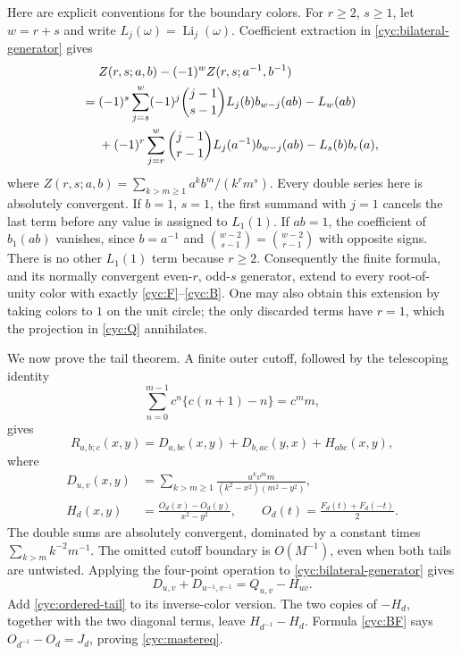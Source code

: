 \documentclass[11pt,a4paper]{article}
\numberwithin{equation}{section}
\theoremstyle{definition}
\theoremstyle{remark}
\begin{document}
Here are explicit conventions for the boundary colors.  For $r\ge2$,
$s\ge1$, let $w=r+s$ and write $L_j(\omega)=\operatorname{Li}_j(\omega)$.
Coefficient extraction in \eqref{cyc:bilateral-generator} gives
\begin{align}\label{cyc:finite-parity}
 &Z(r,s;a,b)-(-1)^w Z(r,s;a^{-1},b^{-1})\notag\\
 ={}&(-1)^s\sum_{j=s}^{w}(-1)^j
          \binom{j-1}{s-1}L_j(b)b_{w-j}(ab)-L_w(ab)\notag\\
 &+(-1)^r\sum_{j=r}^{w}\binom{j-1}{r-1}
               L_j(a^{-1})b_{w-j}(ab)-L_s(b)b_r(a),
\end{align}
where
$Z(r,s;a,b)=\sum_{k>m\ge1}a^k b^m/(k^r m^s)$.
Every double series here is absolutely convergent.  If $b=1$, $s=1$,
the first summand with $j=1$ cancels the last term before any value
is assigned to $L_1(1)$.  If $ab=1$, the coefficient of $b_1(ab)$
vanishes, since $b=a^{-1}$ and
$\binom{w-2}{s-1}=\binom{w-2}{r-1}$ with opposite signs.
There is no other $L_1(1)$ term because $r\ge2$.  Consequently the
finite formula, and its normally convergent even-$r$, odd-$s$
generator, extend to every root-of-unity color with exactly
\eqref{cyc:F}--\eqref{cyc:B}.  One may also obtain this extension
by taking colors to $1$ on the unit circle; the only discarded
terms have $r=1$, which the projection in \eqref{cyc:Q} annihilates.

We now prove the tail theorem.  A finite outer cutoff, followed by
the telescoping identity
\[
 \sum_{n=0}^{m-1}c^n\{c(n+1)-n\}=c^m m,
\]
gives
\begin{equation}\label{cyc:ordered-tail}
 R_{a,b;c}(x,y)=D_{a,bc}(x,y)+D_{b,ac}(y,x)+H_{abc}(x,y),
\end{equation}
where
\begin{align*}
 D_{u,v}(x,y)&=\sum_{k>m\ge1}
   \frac{u^k v^m m}{(k^2-x^2)(m^2-y^2)},\\
 H_d(x,y)&=\frac{O_d(x)-O_d(y)}{x^2-y^2},\qquad
 O_d(t)=\frac{F_d(t)+F_d(-t)}2.
\end{align*}
The double sums are absolutely convergent, dominated by a constant
times $\sum_{k>m}k^{-2}m^{-1}$.  The omitted cutoff boundary is
$O(M^{-1})$, even when both tails are untwisted.  Applying the
four-point operation to \eqref{cyc:bilateral-generator} gives
\[
 D_{u,v}+D_{u^{-1},v^{-1}}=Q_{u,v}-H_{uv}.
\]
Add \eqref{cyc:ordered-tail} to its inverse-color version.  The two
copies of $-H_d$, together with the two diagonal terms, leave
$H_{d^{-1}}-H_d$.  Formula \eqref{cyc:BF} says
$O_{d^{-1}}-O_d=J_d$, proving \eqref{cyc:mastereq}.
\end{document}
